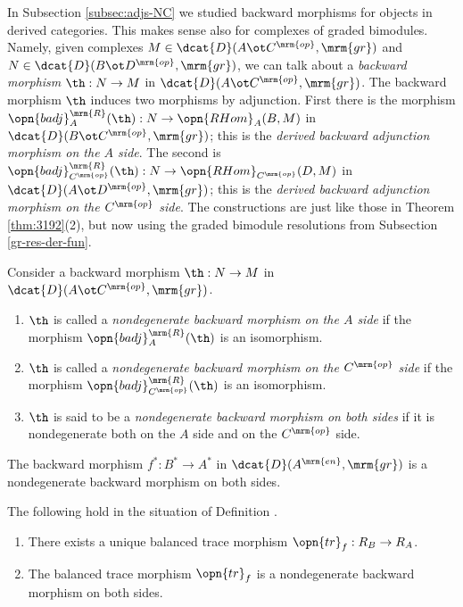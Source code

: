 In Subsection \ref{subsec:adjs-NC} we studied backward morphisms for objects in 
derived categories. This makes sense also for complexes of graded bimodules. 
Namely, given complexes
$M \in \dcat{D}(A \ot C^{\mrm{op}}, \mrm{gr})$
and
$N \in \dcat{D}(B \ot D^{\mrm{op}}, \mrm{gr})$, 
we can talk about a {\em backward morphism} 
$\th : N \to M$ in $\dcat{D}(A \ot C^{\mrm{op}}, \mrm{gr})$. 
The backward morphism $\th$ induces two morphisms by adjunction. 
First there is the morphism 
$\opn{badj}^{\mrm{R}}_{A}(\th) : N \to \opn{RHom}_{A}(B, M)$ 
in $\dcat{D}(B \ot C^{\mrm{op}}, \mrm{gr})$; this is the {\em derived backward 
adjunction morphism on the $A$ side}. The second is 
$\opn{badj}^{\mrm{R}}_{C^{\mrm{op}}}(\th) : N \to 
\opn{RHom}_{C^{\mrm{op}}}(D, M)$
in $\dcat{D}(A \ot D^{\mrm{op}}, \mrm{gr})$; this is the {\em derived backward 
adjunction morphism on the $C^{\mrm{op}}$ side}.
The constructions are just like those in Theorem \ref{thm:3192}(2), 
but now using the graded bimodule resolutions from Subsection 
\ref{gr-res-der-fun}.

\begin{dfn} \label{dfn:4031}
Consider a backward morphism $\th : N \to M$ 
in \lb $\dcat{D}(A \ot C^{\mrm{op}}, \mrm{gr})$. 
\begin{enumerate}
\item $\th$ is called a {\em nondegenerate backward morphism on the $A$ side} 
if the morphism $\opn{badj}^{\mrm{R}}_{A}(\th)$ is an isomorphism. 

\item $\th$ is called a {\em nondegenerate backward morphism on the 
$C^{\mrm{op}}$ side} if the morphism 
$\opn{badj}^{\mrm{R}}_{C^{\mrm{op}}}(\th)$ 
is an isomorphism. 

\item  $\th$ is said to be a {\em nondegenerate backward morphism on both 
sides} if it is nondegenerate both on the $A$ side and on the 
$C^{\mrm{op}}$ side. 
\end{enumerate}
\end{dfn}

\begin{exa} \label{exa:4585}
The backward morphism $f^* : B^* \to A^*$ 
in $\dcat{D}(A^{\mrm{en}}, \mrm{gr})$ is a nondegenerate backward morphism 
on both sides. 
\end{exa}

\begin{thm} \label{thm:4030}
The following hold in the situation of Definition \tup{\ref{dfn:4030}}.
\begin{enumerate}
\item There exists a unique 
balanced trace morphism 
$\opn{tr}_f : R_B \to R_A$.

\item The balanced trace morphism $\opn{tr}_f$ is a nondegenerate backward 
morphism  on both sides.
\end{enumerate}
\end{thm}

